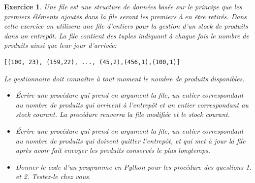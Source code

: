 \documentclass[11pt]{article}
\newtheorem{exercice}{Exercice}[section]
\begin{document}
\begin{exercice}
Une file est une structure de données basée sur le principe que les premiers éléments ajoutés dans la file seront les premiers à en être retirés.
Dans cette exercice on utilisera une file d'entiers pour la gestion d'un stock de produits dans un entrepôt. 
La file contient des tuples indiquant à chaque fois le nombre de produits ainsi que leur jour d'arrivée:

\begin{verbatim}
[(100, 23), {159,22), ..., (45,2),(456,1),(100,1)]
\end{verbatim}
Le gestionnaire doit connaître à tout moment le nombre de produits disponibles. 

\begin{itemize}
\item[1.] Écrire une procédure  qui prend en argument la file, un entier correspondant au nombre de produits qui arrivent à l'entrepôt et un entier correspondant au stock courant. 
La procédure renverra la file modifiée et le stock courant. 
\item[2.]  Écrire une procédure qui prend en argument la file, un entier correspondant au nombre de produits qui doivent quitter l'entrepôt, et qui met à jour la file après avoir fait envoyer les produits 
conservés le plus longtemps. 
\item[3.] Donner le code d'un programme en Python pour les procédure des questions 1. et 2. Testez-le chez vous. 
 \end{itemize}



\end{exercice}
\end{document}
